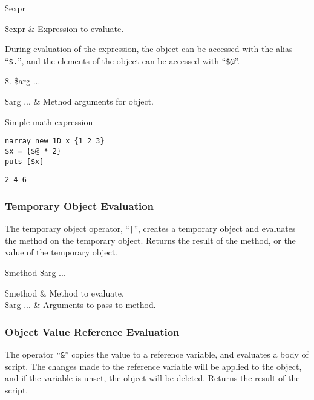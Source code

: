 \begin{syntax}
 \$expr
\end{syntax}
\begin{args}
\$expr & Expression to evaluate.
\end{args}

During evaluation of the expression, the object can be accessed with the alias ``\texttt{\$.}'', and the elements of the object can be accessed with ``\texttt{\$@}''.
\begin{syntax}
\$. \$arg ...
\end{syntax}
\begin{args}
\$arg ... & Method arguments for object.
\end{args}

\begin{example}{Simple math expression}
\begin{lstlisting}
narray new 1D x {1 2 3}
$x = {$@ * 2}
puts [$x]
\end{lstlisting}
\tcblower
\begin{lstlisting}
2 4 6
\end{lstlisting}
\end{example}

\clearpage

\subsubsection{Temporary Object Evaluation}
The temporary object operator, ``\texttt{|}'', creates a temporary object and evaluates the method on the temporary object.
Returns the result of the method, or the value of the temporary object.
\begin{syntax}
 \$method \$arg ...
\end{syntax}
\begin{args}
\$method & Method to evaluate. \\
\$arg ... & Arguments to pass to method.
\end{args}

\subsubsection{Object Value Reference Evaluation}
The operator ``\texttt{\&}'' copies the value to a reference variable, and evaluates a body of script. 
The changes made to the reference variable will be applied to the object, and if the variable is unset, the object will be deleted.
Returns the result of the script.


